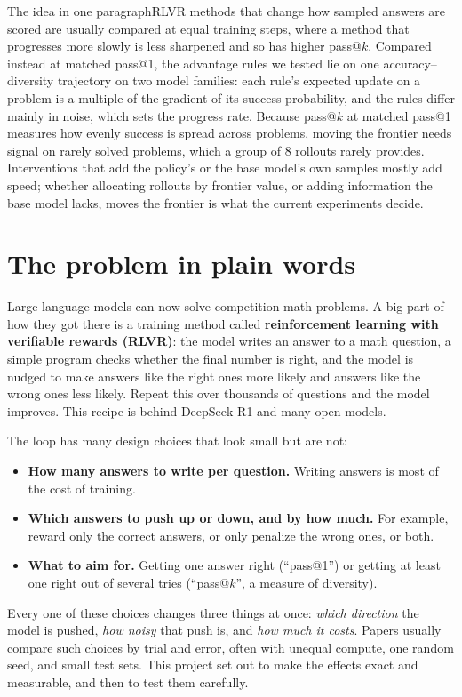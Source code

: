 \documentclass[11pt]{article}
\begin{document}
\begin{idea}{The idea in one paragraph}RLVR methods that change how sampled answers are scored are usually compared at equal training steps, where a method that progresses more slowly is less sharpened and so has higher pass@$k$. Compared instead at matched pass@1, the advantage rules we tested lie on one accuracy--diversity trajectory on two model families: each rule's expected update on a problem is a multiple of the gradient of its success probability, and the rules differ mainly in noise, which sets the progress rate. Because pass@$k$ at matched pass@1 measures how evenly success is spread across problems, moving the frontier needs signal on rarely solved problems, which a group of 8 rollouts rarely provides. Interventions that add the policy's or the base model's own samples mostly add speed; whether allocating rollouts by frontier value, or adding information the base model lacks, moves the frontier is what the current experiments decide.
\end{idea}

\setcounter{tocdepth}{1}
\tableofcontents
\newpage

\section{The problem in plain words}

Large language models can now solve competition math problems. A big part of how they got there is a training method called \textbf{reinforcement learning with verifiable rewards (RLVR)}: the model writes an answer to a math question, a simple program checks whether the final number is right, and the model is nudged to make answers like the right ones more likely and answers like the wrong ones less likely. Repeat this over thousands of questions and the model improves. This recipe is behind DeepSeek-R1 and many open models.

The loop has many design choices that look small but are not:
\begin{itemize}[leftmargin=*,itemsep=1pt]
\item \textbf{How many answers to write per question.} Writing answers is most of the cost of training.
\item \textbf{Which answers to push up or down, and by how much.} For example, reward only the correct answers, or only penalize the wrong ones, or both.
\item \textbf{What to aim for.} Getting one answer right (``pass@1'') or getting at least one right out of several tries (``pass@$k$'', a measure of diversity).
\end{itemize}
Every one of these choices changes three things at once: \emph{which direction} the model is pushed, \emph{how noisy} that push is, and \emph{how much it costs}. Papers usually compare such choices by trial and error, often with unequal compute, one random seed, and small test sets. This project set out to make the effects exact and measurable, and then to test them carefully.
\end{document}

